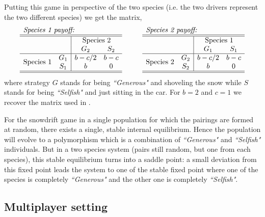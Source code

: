 \documentclass[12pt]{article}
\begin{document}
\begin{appendices}
Putting this game in perspective of the two species (i.e. the two drivers represent the two different species) we get the matrix,\\
%
\begin{equation}\label{}
\begin{array}{cc|cc}
\multicolumn{4}{l}{\textit{Species 1 payoff:}} \\
\hline\hline
& & \multicolumn{2}{c}{\text{Species 2}}\\
&	&	G_2		&	S_2	\\
\hline
 \multirow{2}{*}{Species 1} & G_1 	& b-c/2 &	b-c \\
&	S_1	&  b & 0 \\
 \hline\hline
\end{array}
\hspace{1cm}
\begin{array}{cc|cc}
\multicolumn{4}{l}{\textit{Species 2 payoff:}} \\
\hline\hline
& & \multicolumn{2}{c}{\text{Species 1}}\\
&	&	G_1		&	S_1	\\
\hline
 \multirow{2}{*}{Species 2} & G_2 	& b-c/2 &	b-c \\
&	S_2	& b & 0  \\
 \hline\hline
\end{array}
\end{equation}
%
where strategy $G$ stands for being \textit{``Generous"} and shoveling the snow while $S$ stands for being \textit{``Selfish"} and just sitting in the car.
For $b=2$ and $c=1$ we recover the matrix used in \citep{bergstrom:PNAS:2003}.

For the snowdrift game in a single population for which the pairings are formed at random, there exists a single, stable internal equilibrium.
Hence the population will evolve to a polymorphism which is a combination of \textit{``Generous"} and \textit{``Selfish"} individuals.
But in a two species system (pairs still random, but one from each species), this stable equilibrium turns into a saddle point: a small deviation from this fixed point leads the system to one of the stable fixed point where one of the species is completely \textit{``Generous"} and the other one is completely \textit{``Selfish"}.

\subsection*{Multiplayer setting}



\end{appendices}
\end{document}
